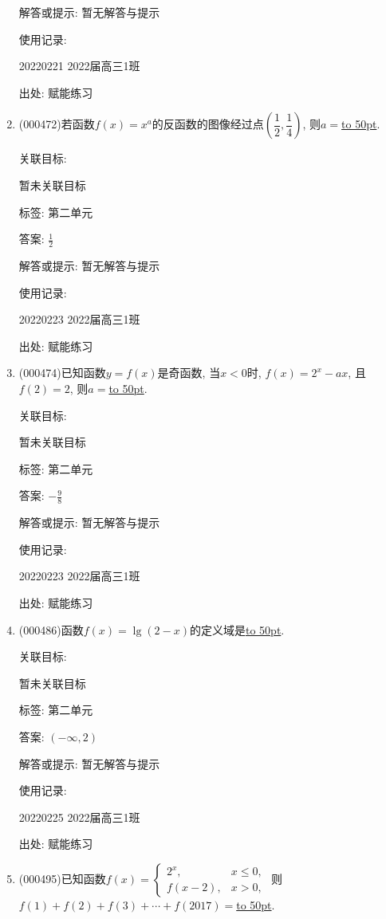 \documentclass[10pt,a4paper]{article}
\newcommand{\blank}[1]{\underline{\hbox to #1pt{}}}
\begin{document}
\begin{enumerate}[1.]
解答或提示: 暂无解答与提示

使用记录:

20220221	2022届高三1班	


出处: 赋能练习
\item { (000472)}若函数$f(x)=x^a$的反函数的图像经过点$(\dfrac12,\dfrac14)$, 则$a=$\blank{50}.


关联目标:

暂未关联目标



标签: 第二单元

答案: $\frac 12$

解答或提示: 暂无解答与提示

使用记录:

20220223	2022届高三1班	


出处: 赋能练习
\item { (000474)}已知函数$y=f(x)$是奇函数, 当$x<0$时, $f(x)=2^x-ax$, 且$f(2)=2$, 则$a=$\blank{50}.


关联目标:

暂未关联目标



标签: 第二单元

答案: $-\frac 98$

解答或提示: 暂无解答与提示

使用记录:

20220223	2022届高三1班	


出处: 赋能练习
\item { (000486)}函数$f(x)=\lg(2-x)$的定义域是\blank{50}.


关联目标:

暂未关联目标



标签: 第二单元

答案: $(-\infty ,2)$

解答或提示: 暂无解答与提示

使用记录:

20220225	2022届高三1班	


出处: 赋能练习
\item { (000495)}已知函数$f(x)=\begin{cases} 2^x, & x\le 0, \\ f(x-2), & x>0, \end{cases}$ 则$f(1)+f(2)+f(3)+\cdots+f(2017)=$\blank{50}.



\end{enumerate}
\end{document}
